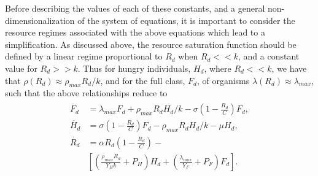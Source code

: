 \documentclass[twocolumn,preprintnumbers,amsmath,amssymb,superscriptaddress]{revtex4}
\begin{document}
\begin{bibunit}[unsrt]
Before describing the values of each of these constants, and a general non-dimensionalization of the system of equations, it is important to consider the resource regimes associated with the above equations which lead to a simplification. As discussed above, the resource saturation function should be defined by a linear regime proportional to $R_{d}$ when $R_{d}<<k$, and a constant value for $R_{d}>>k$. Thus for hungry individuals, $H_{d}$, where $R_{d}<<k$, we have that $\rho\left(R_{d}\right)\approx\rho_{max}R_{d}/k$, and for the full class, $F_{d}$, of organisms $\lambda\left(R_{d}\right)\approx\lambda_{max}$, such that the above relationships reduce to
\begin{align}
\begin{split}
\dot{F_{d}} &= \lambda_{max} F_{d} + \rho_{max}R_{d}H_{d}/k - \sigma \left(1-\frac{R_{d}}{C}\right)F_{d},  \\
\dot{H_{d}} &= \sigma \left(1-\frac{R_{d}}{C}\right)F_{d} - \rho_{max}R_{d} H_{d}/k - \mu H_{d},  \\
\dot{R_{d}} &= \alpha R_{d}\left(1-\frac{R_{d}}{C}\right) -\\
& \left[\left(\frac{\rho_{max}R_{d}}{Y_{H}k}+P_{H}\right)H_{d}+\left(\frac{\lambda_{max}}{Y_{F}}+P_{F}\right)F_{d}\right].
\end{split}
\end{align}


\end{bibunit}
\end{document}
